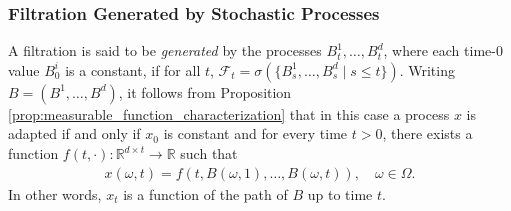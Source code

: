 \documentclass[\topdir/lecture\_notes.tex]{subfiles}
\begin{document}
\subsubsection{Filtration Generated by Stochastic Processes}
A filtration is said to be \emph{generated} by the processes \(B_t^{1}, \ldots, B_t^{d}\),
where each time-\(0\) value \(B_{0}^{i}\) is a constant, if for all \(t\), \( \mathcal{F}_{t}=\sigma(\{B_{s}^{1}, \ldots, B_{s}^{d} \mid s \leq t\})\). Writing \(B=(B^{1}, \ldots, B^{d})\), it follows from Proposition \ref{prop:measurable_function_characterization} that in this case a process \(x\) is adapted if and only if \(x_{0}\) is constant and for every time \(t>0\), there exists a function \(f(t, \cdot): \mathbb{R}^{d \times t} \rightarrow \mathbb{R}\) such that
\begin{align*}
x(\omega, t)=f(t, B(\omega, 1), \ldots, B(\omega, t)), \quad \omega \in \Omega .
\end{align*}
In other words, \(x_{t}\) is a function of the path of \(B\) up to time \(t\).
\end{document}
